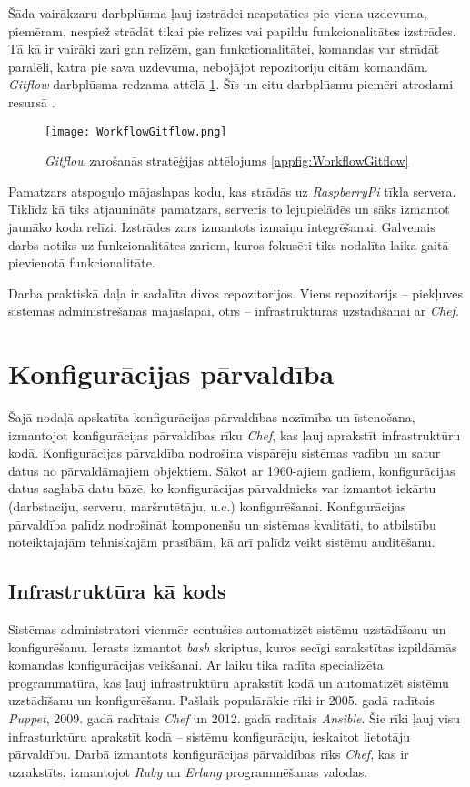 Šāda vairākzaru darbplūsma ļauj izstrādei neapstāties pie viena uzdevuma, piemēram, nespiež strādāt tikai pie relīzes vai papildu funkcionalitātes izstrādes. Tā kā ir vairāki zari gan relīzēm, gan funkctionalitātei, komandas var strādāt paralēli, katra pie sava uzdevuma, nebojājot repozitoriju citām komandām.
 \textit{Gitflow} darbplūsma redzama attēlā \ref{fig:WorkflowGitflow}. Šīs un citu darbplūsmu piemēri atrodami resursā \cite{workflow-comparison}.
\begin{figure}[H]%
	\centering
	\captionsetup{justification=centering}
	\texttt{[image: WorkflowGitflow.png]}
	\caption{\textit{Gitflow} zarošanās stratēģijas attēlojums \ref{appfig:WorkflowGitflow}}
	\label{fig:WorkflowGitflow}
\end{figure}
Pamatzars atspoguļo mājaslapas kodu, kas strādās uz \textit{RaspberryPi} tīkla servera. Tiklīdz kā tiks atjaunināts pamatzars, serveris to lejupielādēs un sāks izmantot jaunāko koda relīzi.
Izstrādes zars izmantots izmaiņu integrēšanai.
Galvenais darbs notiks uz funkcionalitātes zariem, kuros fokusēti tiks nodalīta laika gaitā pievienotā funkcionalitāte.



Darba praktiskā daļa ir sadalīta divos repozitorijos. Viens repozitorijs -- piekļuves sistēmas administrēšanas mājaslapai, otrs -- infrastruktūras uzstādīšanai ar \textit{Chef}.

\chapter{Konfigurācijas pārvaldība}
Šajā nodaļā apskatīta konfigurācijas pārvaldības nozīmība un īstenošana, izmantojot konfigurācijas pārvaldības rīku \textit{Chef}, kas ļauj aprakstīt infrastruktūru kodā.
Konfigurācijas pārvaldība nodrošina vispārēju sistēmas vadību un satur datus no pārvaldāmajiem objektiem. Sākot ar 1960-ajiem gadiem, konfigurācijas datus saglabā datu bāzē, ko konfigurācijas pārvaldnieks var izmantot iekārtu (darbstaciju, serveru, maršrutētāju, u.c.) konfigurēšanai.
Konfigurācijas pārvaldība palīdz nodrošināt komponenšu un sistēmas kvalitāti, to atbilstību noteiktajajām tehniskajām prasībām, kā arī palīdz veikt sistēmu auditēšanu.

\section{Infrastruktūra kā kods}
Sistēmas administratori vienmēr centušies automatizēt sistēmu uzstādīšanu un konfigurēšanu. Ierasts izmantot \textit{bash} skriptus, kuros secīgi sarakstītas izpildāmās komandas konfigurācijas veikšanai. Ar laiku tika radīta specializēta programmatūra, kas ļauj infrastruktūru aprakstīt kodā un automatizēt sistēmu uzstādīšanu un konfigurēšanu. Pašlaik populārākie rīki ir 2005. gadā radītais \textit{Puppet}, 2009. gadā radītais \textit{Chef} un 2012. gadā radītais \textit{Ansible}. Šie rīki ļauj visu infrasturktūru aprakstīt kodā -- sistēmu konfigurāciju, ieskaitot lietotāju pārvaldību. Darbā izmantots konfigurācijas pārvaldības rīks \textit{Chef}, kas ir uzrakstīts, izmantojot \textit{Ruby} un \textit{Erlang} programmēšanas valodas.

